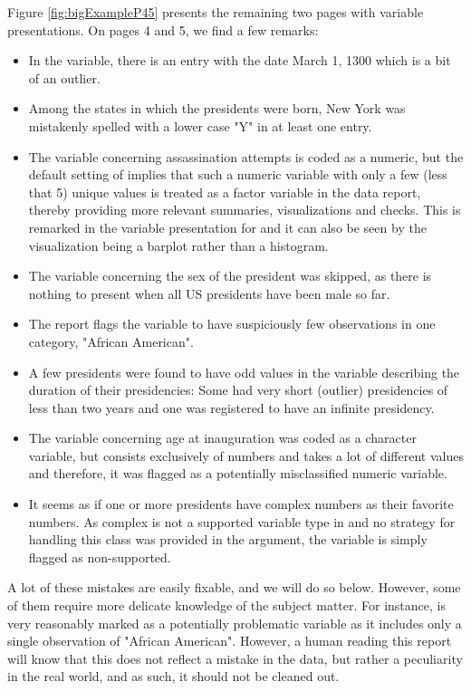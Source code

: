 \documentclass[article,shortnames]{jss}
\begin{document}
Figure \ref{fig:bigExampleP45} presents the remaining two pages with variable presentations. On pages 4 and 5, we find a few remarks:
\begin{itemize}
\item In the  variable, there is an entry with the date March 1, 1300 which is a bit of an outlier. 
\item Among the states in which the presidents were born, New York was mistakenly spelled with a lower case "Y" in at least one entry.
\item The variable concerning assassination attempts is coded as a numeric, but the default  setting of  implies that such a numeric variable with only a few (less that 5) unique values is treated as a factor variable in the data report, thereby providing more relevant summaries, visualizations and checks. This is remarked in the variable presentation for  and it can also be seen by the visualization being a barplot rather than a histogram.
\item The variable concerning the sex of the president was skipped, as there is nothing to present when all US presidents have been male so far.
\item The report flags the variable  to have suspiciously few observations in one category, "African American". 
\item A few presidents were found to have odd values in the variable describing the duration of their presidencies: Some had very short (outlier) presidencies of less than two years and one was registered to have an infinite presidency. 
\item The variable concerning age at inauguration was coded as a character variable, but consists exclusively of numbers and takes a lot of different values and therefore, it was flagged as a potentially misclassified numeric variable.
\item It seems as if one or more presidents have complex numbers as their favorite numbers. As complex is not a supported variable type in  and no strategy for handling this class was provided in the  argument, the variable is simply flagged as non-supported.
\end{itemize}
A lot of these mistakes are easily fixable, and we will do so below. However, some of them require more delicate knowledge of the subject matter. For instance,  is very reasonably marked as a potentially problematic variable as it includes only a single observation of "African American". However, a human reading this report will know that this does not reflect a mistake in the data, but rather a peculiarity in the real world, and as such, it should not be cleaned out. 
\end{document}
